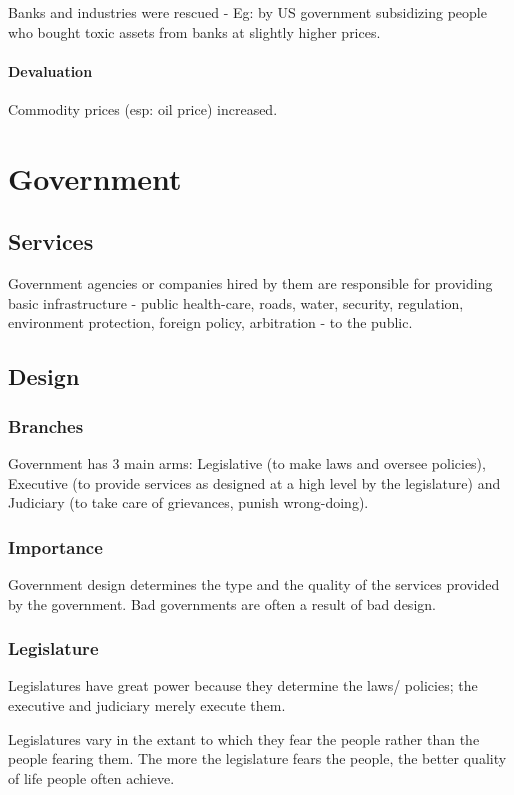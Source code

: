 \documentclass[oneside, article]{memoir}
\begin{document}
Banks and industries were rescued - Eg: by US government subsidizing people who bought toxic assets from banks at slightly higher prices. 

\subsubsection{Devaluation}
Commodity prices (esp: oil price) increased.

\chapter{Government}
\section{Services}
Government agencies or companies hired by them are responsible for providing basic infrastructure - public health-care, roads, water, security, regulation, environment protection, foreign policy, arbitration - to the public.

\section{Design}
\subsection{Branches}
Government has 3 main arms: Legislative (to make laws and oversee policies), Executive (to provide services as designed at a high level by the legislature) and Judiciary (to take care of grievances, punish wrong-doing).

\subsection{Importance}
Government design determines the type and the quality of the services provided by the government. Bad governments are often a result of bad design.

\subsection{Legislature}
Legislatures have great power because they determine the laws/ policies; the executive and judiciary merely execute them.

Legislatures vary in the extant to which they fear the people rather than the people fearing them. The more the legislature fears the people, the better quality of life people often achieve.
\end{document}
